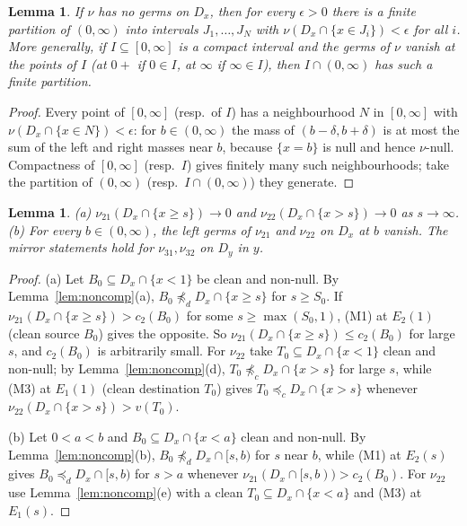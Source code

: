\documentclass[11pt]{article}
\newtheorem{lemma}[theorem]{Lemma}
\theoremstyle{definition}\newtheorem{definition}[theorem]{Definition}
\theoremstyle{remark}\newtheorem{remark}[theorem]{Remark}
\begin{document}
\begin{lemma}\label{lem:slabs}
If $\nu$ has no germs on $D_x$, then for every $\epsilon>0$ there is a
finite partition of $(0,\infty)$ into intervals $J_1,\dots,J_N$ with
$\nu(D_x\cap\{x\in J_i\})<\epsilon$ for all $i$. More generally, if
$I\subseteq[0,\infty]$ is a compact interval and the germs of $\nu$ vanish at
the points of $I$ (at $0+$ if $0\in I$, at $\infty$ if $\infty\in I$), then
$I\cap(0,\infty)$ has such a finite partition.
\end{lemma}
\begin{proof}
Every point of $[0,\infty]$ (resp.\ of $I$) has a neighbourhood $N$
in $[0,\infty]$ with $\nu(D_x\cap\{x\in N\})<\epsilon$: for $b\in(0,\infty)$ the mass of $(b-\delta,b+\delta)$ is at
most the sum of the left and right masses near $b$, because $\{x=b\}$ is null
and hence $\nu$-null. Compactness of $[0,\infty]$ (resp.\ $I$) gives
finitely many such neighbourhoods; take the partition of $(0,\infty)$
(resp.\ $I\cap(0,\infty)$) they generate.
\end{proof}

\begin{lemma}\label{lem:tails}
(a) $\nu_{21}(D_x\cap\{x\ge s\})\to0$ and $\nu_{22}(D_x\cap\{x>s\})\to0$ as
$s\to\infty$. (b) For every $b\in(0,\infty)$, the left germs of $\nu_{21}$
and $\nu_{22}$ on $D_x$ at $b$ vanish. The mirror statements hold for
$\nu_{31},\nu_{32}$ on $D_y$ in $y$.
\end{lemma}
\begin{proof}
(a) Let $B_0\subseteq D_x\cap\{x<1\}$ be clean and non-null. By
Lemma~\ref{lem:noncomp}(a), $B_0\not\preceq_dD_x\cap\{x\ge s\}$ for $s\ge
S_0$. If $\nu_{21}(D_x\cap\{x\ge s\})>c_2(B_0)$ for some $s\ge\max(S_0,1)$,
(M1) at $E_2(1)$ (clean source $B_0$) gives the opposite. So
$\nu_{21}(D_x\cap\{x\ge s\})\le c_2(B_0)$ for large $s$, and $c_2(B_0)$ is
arbitrarily small. For $\nu_{22}$ take $T_0\subseteq D_x\cap\{x<1\}$ clean
and non-null; by Lemma~\ref{lem:noncomp}(d), $T_0\not\preceq_cD_x\cap\{x>s\}$
for large $s$, while (M3) at $E_1(1)$ (clean destination $T_0$) gives
$T_0\preceq_cD_x\cap\{x>s\}$ whenever $\nu_{22}(D_x\cap\{x>s\})>v(T_0)$.

(b) Let $0<a<b$ and $B_0\subseteq D_x\cap\{x<a\}$ clean and non-null. By
Lemma~\ref{lem:noncomp}(b), $B_0\not\preceq_dD_x\cap[s,b)$ for $s$ near $b$,
while (M1) at $E_2(s)$ gives $B_0\preceq_dD_x\cap[s,b)$ for $s>a$ whenever
$\nu_{21}(D_x\cap[s,b))>c_2(B_0)$. For $\nu_{22}$ use
Lemma~\ref{lem:noncomp}(e) with a clean $T_0\subseteq D_x\cap\{x<a\}$ and
(M3) at $E_1(s)$.
\end{proof}
\end{document}
